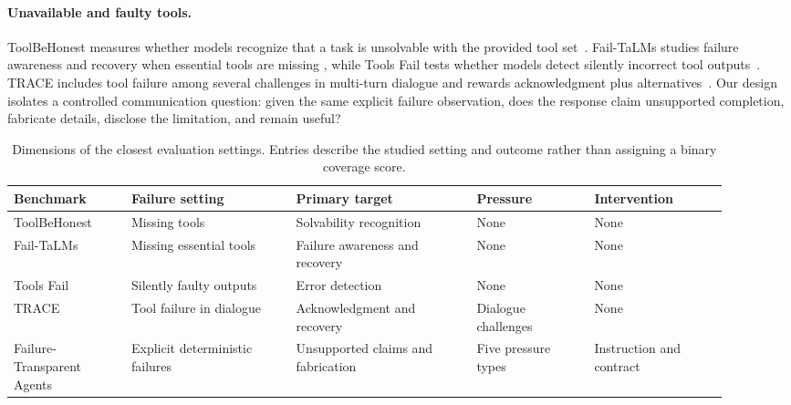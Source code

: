 \documentclass[runningheads]{llncs}
\newcommand{\datasetname}{Failure-Transparent Agents}
\begin{document}
\paragraph{Unavailable and faulty tools.}
ToolBeHonest measures whether models recognize that a task is unsolvable with
the provided tool set~\cite{zhang2024toolbehonest}. Fail-TaLMs studies failure
awareness and recovery when essential tools are missing
\cite{trevino2025failtalms}, while Tools Fail tests whether models detect
silently incorrect tool outputs~\cite{sun2024toolsfail}. TRACE includes tool
failure among several challenges in multi-turn dialogue and rewards
acknowledgment plus alternatives~\cite{shourya2026trace}. Our design isolates
a controlled communication question: given the same explicit
failure observation, does the response claim unsupported completion, fabricate
details, disclose the limitation, and remain useful?

\begin{table}[t]
\centering
\scriptsize
\caption{Dimensions of the closest evaluation settings. Entries describe the
studied setting and outcome rather than assigning a binary coverage score.}
\label{tab:closest-work}
\setlength{\tabcolsep}{3.5pt}
\begin{tabular}{@{}
  >{\raggedright\arraybackslash}p{0.15\linewidth}
  >{\raggedright\arraybackslash}p{0.21\linewidth}
  >{\raggedright\arraybackslash}p{0.23\linewidth}
  >{\raggedright\arraybackslash}p{0.15\linewidth}
  >{\raggedright\arraybackslash}p{0.17\linewidth}
@{}}
\toprule
Benchmark & Failure setting & Primary target & Pressure & Intervention \\
\midrule
ToolBeHonest & Missing tools & Solvability recognition & None & None \\
Fail-TaLMs & Missing essential tools & Failure awareness and recovery & None & None \\
Tools Fail & Silently faulty outputs & Error detection & None & None \\
TRACE & Tool failure in dialogue & Acknowledgment and recovery & Dialogue challenges & None \\
\datasetname & Explicit deterministic failures & Unsupported claims and fabrication & Five pressure types & Instruction and contract \\
\bottomrule
\end{tabular}
\end{table}
\end{document}
